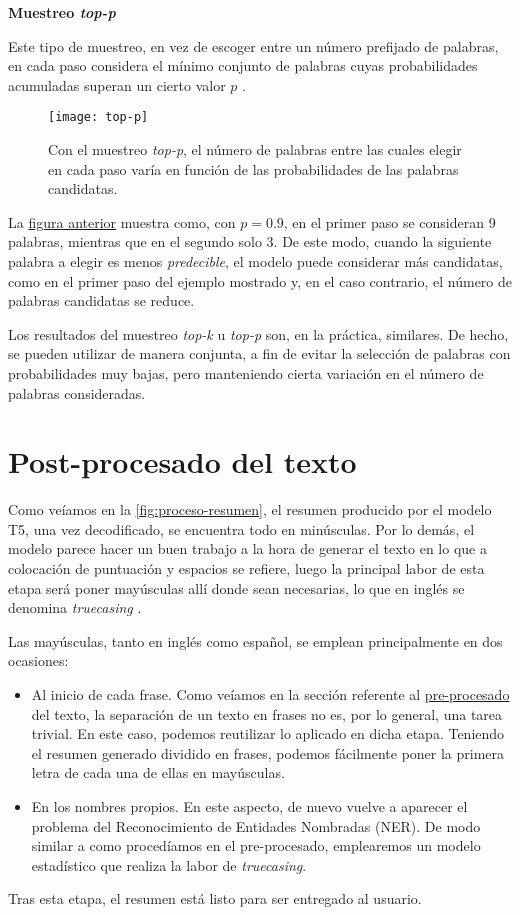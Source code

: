 \bigskip
\noindent
\textbf{Muestreo \emph{top-p}}

Este tipo de muestreo, en vez de escoger entre un número prefijado de palabras, en cada paso considera el mínimo conjunto de palabras cuyas probabilidades acumuladas superan un cierto valor $p$ \cite{holtzman20}.

\begin{figure}[!h]
	\centering
	\texttt{[image: top-p]}
	\caption{Con el muestreo \emph{top-p}, el número de palabras entre las cuales elegir en cada paso varía en función de las probabilidades de las palabras candidatas.}
	\label{top-p}
\end{figure}

La \hyperref[top-p]{figura anterior} muestra como, con $p=0.9$, en el primer paso se consideran 9 palabras, mientras que en el segundo solo 3. De este modo, cuando la siguiente palabra a elegir es menos \emph{predecible}, el modelo puede considerar más candidatas, como en el primer paso del ejemplo mostrado y, en el caso contrario, el número de palabras candidatas se reduce.

Los resultados del muestreo \emph{top-k} u \emph{top-p} son, en la práctica, similares. De hecho, se pueden utilizar de manera conjunta, a fin de evitar la selección de palabras con probabilidades muy bajas, pero manteniendo cierta variación en el número de palabras consideradas.



\section{Post-procesado del texto} \label{sec:postprocesado}

Como veíamos en la \autoref{fig:proceso-resumen}, el resumen producido por el modelo T5, una vez decodificado, se encuentra todo en minúsculas. Por lo demás, el modelo parece hacer un buen trabajo a la hora de generar el texto en lo que a colocación de puntuación y espacios se refiere, luego la principal labor de esta etapa será poner mayúsculas allí donde sean necesarias, lo que en inglés se denomina \emph{truecasing} \cite{lita03}.

Las mayúsculas, tanto en inglés como español, se emplean principalmente en dos ocasiones:

\vspace*{-\baselineskip}
\begin{itemize}
	\item Al inicio de cada frase. Como veíamos en la sección referente al \hyperref[sec:preprocesado]{pre-procesado} del texto, la separación de un texto en frases no es, por lo general, una tarea trivial. En este caso, podemos reutilizar lo aplicado en dicha etapa. Teniendo el resumen generado dividido en frases, podemos fácilmente poner la primera letra de cada una de ellas en mayúsculas.
	\item En los nombres propios. En este aspecto, de nuevo vuelve a aparecer el problema del Reconocimiento de Entidades Nombradas (NER). De modo similar a como procedíamos en el pre-procesado, emplearemos un modelo estadístico que realiza la labor de \emph{truecasing}.
\end{itemize}

Tras esta etapa, el resumen está listo para ser entregado al usuario.